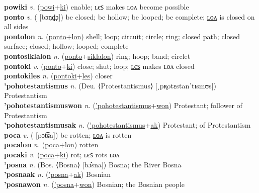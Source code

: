 \textbf{powiki} \textit{v.} (\hyperref[powi]{powi}+\hyperref[ki]{ki})
enable; ʟєꜱ makes ʟᴏᴧ become possible \label{powiki} \\
\textbf{ponto} \textit{v.} ( [bɔn̪d̪̤ɔ])
be closed; be hollow; be looped; be complete; \hyperref[pontolon]{ʟᴏᴧ} is closed on all sides \label{ponto} \\
\textbf{pontolon} \textit{n.} (\hyperref[ponto]{ponto}+\hyperref[lon]{lon})
shell; loop; circuit; circle; ring; closed path; closed surface; closed; hollow; looped; complete \label{pontolon} \\
\textbf{pontosiklalon} \textit{n.} (\hyperref[ponto]{ponto}+\hyperref[siklalon]{siklalon})
ring; hoop; band; circlet \label{pontosiklalon} \\
\textbf{pontoki} \textit{v.} (\hyperref[ponto]{ponto}+\hyperref[ki]{ki})
close; shut; loop; \hyperref[pontokiles]{ʟєꜱ} makes ʟᴏᴧ closed \label{pontoki} \\
\textbf{pontokiles} \textit{n.} (\hyperref[pontoki]{pontoki}+\hyperref[les]{les})
closer \label{pontokiles} \\
\textbf{'pohotestantismus} \textit{n.} (Deu. ⟨Protestantismus⟩ [ˌpʀ̥otɛstanˈtɪsmʊs])
Protestantism \label{'pohotestantismus} \\
\textbf{'pohotestantismuswon} \textit{n.} (\hyperref['pohotestantismus]{'pohotestantismus}+\hyperref[won]{won})
Protestant; follower of Protestantism \label{'pohotestantismuswon} \\
\textbf{'pohotestantismusak} \textit{n.} (\hyperref['pohotestantismus]{'pohotestantismus}+\hyperref[ak]{ak})
Protestant; of Protestantism \label{'pohotestantismusak} \\
\textbf{poca} \textit{v.} ( [pɔt͡ɕa])
be rotten; \hyperref[pocalon]{ʟᴏᴧ} is rotten \label{poca} \\
\textbf{pocalon} \textit{n.} (\hyperref[poca]{poca}+\hyperref[lon]{lon})
rotten \label{pocalon} \\
\textbf{pocaki} \textit{v.} (\hyperref[poca]{poca}+\hyperref[ki]{ki})
rot; ʟєꜱ rots ʟᴏᴧ \label{pocaki} \\
\textbf{'posna} \textit{n.} (Bos. ⟨Bosna⟩ [bɔ̂sna])
Bosna; the River Bosna \label{'posna} \\
\textbf{'posnaak} \textit{n.} (\hyperref['posna]{'posna}+\hyperref[ak]{ak})
Bosnian \label{'posnaak} \\
\textbf{'posnawon} \textit{n.} (\hyperref['posna]{'posna}+\hyperref[won]{won})
Bosnian; the Bosnian people \label{'posnawon} \\

